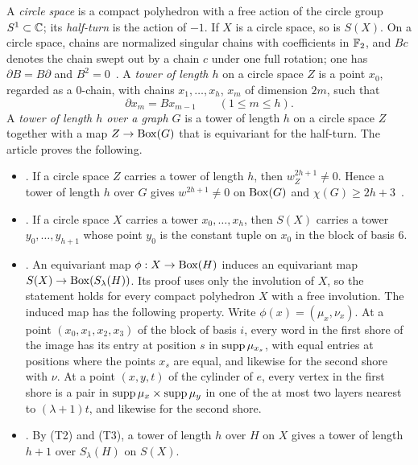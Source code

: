 A \emph{circle space} is a compact polyhedron with a free action of the circle group $S^1\subset\mathbb C$; its \emph{half-turn} is the action of $-1$. If $X$ is a circle space, so is $S(X)$. On a circle space, chains are normalized singular chains with coefficients in $\mathbb F_2$, and $Bc$ denotes the chain swept out by a chain $c$ under one full rotation; one has $\partial B=B\partial$ and $B^2=0$~\cite[Appendix~B.1]{Z}. A \emph{tower of length $h$} on a circle space $Z$ is a point $x_0$, regarded as a $0$-chain, with chains $x_1,\ldots,x_h$, $x_m$ of dimension $2m$, such that
\begin{equation}\label{eq:tower}
 \partial x_m=Bx_{m-1}\qquad(1\le m\le h).
\end{equation}
A \emph{tower of length $h$ over a graph $G$} is a tower of length $h$ on a circle space $Z$ together with a map $Z\to\operatorname{Box}(G)$ that is equivariant for the half-turn. The article proves the following.
\begin{itemize}
\item[(T1)] \cite[Lemma~B.2]{Z}. If a circle space $Z$ carries a tower of length $h$, then $w_Z^{2h+1}\ne0$. Hence a tower of length $h$ over $G$ gives $w^{2h+1}\ne0$ on $\operatorname{Box}(G)$ and $\chi(G)\ge2h+3$~\cite[Proposition~3.2]{Z}.
\item[(T2)] \cite[Lemma~B.1(a)]{Z}. If a circle space $X$ carries a tower $x_0,\ldots,x_h$, then $S(X)$ carries a tower $y_0,\ldots,y_{h+1}$ whose point $y_0$ is the constant tuple on $x_0$ in the block of basis $6$.
\item[(T3)] \cite[Lemma~B.3]{Z}. An equivariant map $\phi:X\to\operatorname{Box}(H)$ induces an equivariant map $S(X)\to\operatorname{Box}(S_\lambda(H))$. Its proof uses only the involution of $X$, so the statement holds for every compact polyhedron $X$ with a free involution. The induced map has the following property. Write $\phi(x)=(\mu_x,\nu_x)$. At a point $(x_0,x_1,x_2,x_3)$ of the block of basis $i$, every word in the first shore of the image has its entry at position $s$ in $\operatorname{supp}\mu_{x_s}$, with equal entries at positions where the points $x_s$ are equal, and likewise for the second shore with $\nu$. At a point $(x,y,t)$ of the cylinder of $e$, every vertex in the first shore is a pair in $\operatorname{supp}\mu_x\times\operatorname{supp}\mu_y$ in one of the at most two layers nearest to $(\lambda+1)t$, and likewise for the second shore.
\item[(T4)] \cite[Theorem~3.3]{Z}. By (T2) and (T3), a tower of length $h$ over $H$ on $X$ gives a tower of length $h+1$ over $S_\lambda(H)$ on $S(X)$.
\end{itemize}

